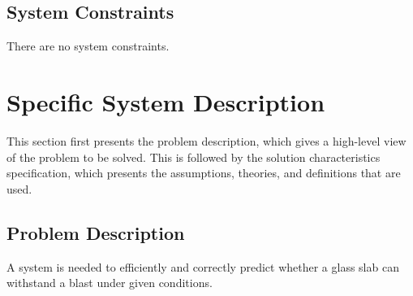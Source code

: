 \documentclass[12pt]{article}
\begin{document}
\subsection{System Constraints}
\label{Sec:SysConstraints}
There are no system constraints.
\section{Specific System Description}
\label{Sec:SpecSystDesc}
This section first presents the problem description, which gives a high-level view of the problem to be solved. This is followed by the solution characteristics specification, which presents the assumptions, theories, and definitions that are used.
\subsection{Problem Description}
\label{Sec:ProbDesc}
A system is needed to efficiently and correctly predict whether a glass slab can withstand a blast under given conditions.
\end{document}
